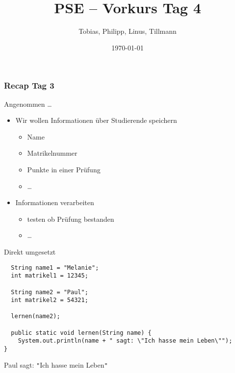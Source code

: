 \documentclass{../../presentation}
\title{PSE – Vorkurs Tag 4}
\author{Tobias, Philipp, Linus, Tillmann}
\institute{FIUS - Fachgruppe Informatik Universität Stuttgart}
\date{\today}
\begin{document}
\begin{frame}
	\titlepage
\end{frame}

\begin{frame}
	\listoftodos
\end{frame}

\begin{frame}
	\frametitle{Recap Tag 3}
\end{frame}


\begin{frame}{Angenommen \dots}
	\begin{itemize}
		\item Wir wollen Informationen über Studierende speichern
		      \begin{itemize}
			      \item[\textbullet] Name
			      \item[\textbullet] Matrikelnummer
			      \item[\textbullet] Punkte in einer Prüfung
			      \item[\textbullet] \dots
		      \end{itemize}
		\item Informationen verarbeiten
		      \begin{itemize}
			      \item[\textbullet] testen ob Prüfung bestanden
			      \item[\textbullet] \dots
		      \end{itemize}
	\end{itemize}
\end{frame}


\begin{frame}[fragile]{Direkt umgesetzt}
	\begin{verbatim}
  String name1 = "Melanie";
  int matrikel1 = 12345;

  String name2 = "Paul";
  int matrikel2 = 54321;

  lernen(name2);

  public static void lernen(String name) {
    System.out.println(name + " sagt: \"Ich hasse mein Leben\"");
}

\end{verbatim}
\begin{ausgabe}
  Paul sagt: \texttt{"}Ich hasse mein Leben\texttt{"}
\end{ausgabe}
\end{frame}
\end{document}
